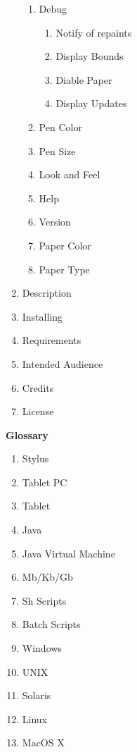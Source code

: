 \documentclass[letterpaper,11pt]{article}
\begin{document}
\begin{enumerate}
\begin{enumerate}
            \item Debug
                    \begin{enumerate}
                      \item Notify of repaints
                      \item Display Bounds
                      \item Diable Paper
                      \item Display Updates
                    \end{enumerate}
            \item Pen Color
            \item Pen Size
            \item Look and Feel
            \item Help
            \item Version
            \item Paper Color
            \item Paper Type
          \end{enumerate}
    \item Description
    \item Installing
    \item Requirements
    \item Intended Audience
    \item Credits
    \item License
  \end{enumerate}
  
  \textbf{Glossary}
  \begin{enumerate}
    \item Stylus
    \item Tablet PC
    \item Tablet
    \item Java
    \item Java Virtual Machine
    \item Mb/Kb/Gb
    \item Sh Scripts
    \item Batch Scripts
    \item Windows
    \item UNIX
    \item Solaris
    \item Linux
    \item MacOS X
  \end{enumerate}
  
\end{document}
